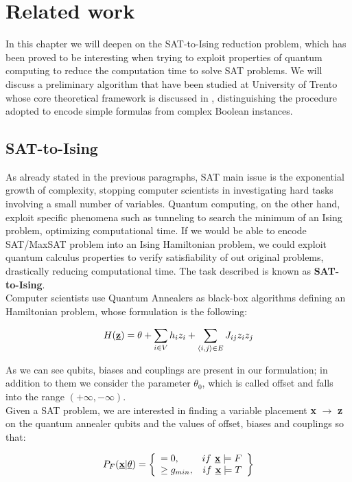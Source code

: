 \chapter{Related work}
\label{cha:related}

In this chapter we will deepen on the SAT-to-Ising reduction problem, which has been proved to be interesting when trying to exploit properties of quantum computing to reduce the computation time to solve SAT problems. We will discuss a preliminary algorithm that have been studied at University of Trento whose core theoretical framework is discussed in \cite{pa12}, distinguishing the procedure adopted to encode simple formulas from complex Boolean instances.

\section{SAT-to-Ising}
\label{sec:SATtoQUBO}

As already stated in the previous paragraphs, SAT main issue is the exponential growth of complexity, stopping computer scientists in investigating hard tasks involving a small number of variables. Quantum computing, on the other hand, exploit specific phenomena such as tunneling to search the minimum of an Ising problem, optimizing computational time. If we would be able to encode SAT/MaxSAT problem into an Ising Hamiltonian problem, we could exploit quantum calculus properties to verify satisfiability of out original problems, drastically reducing computational time. The task described is known as \textbf{SAT-to-Ising}. \\
Computer scientists use Quantum Annealers as black-box algorithms defining an Hamiltonian problem, whose formulation is the following:

\begin{equation}
    H(\textbf{\underline{z}}) =\theta + \sum_{i \in V} h_iz_i + \sum_{\langle i,j\rangle \in E} J_{ij} z_iz_j
\end{equation}

As we can see qubits, biases and couplings are present in our formulation; in addition to them we consider the parameter $\theta_0$, which is called offset and falls into the range $(+\infty, -\infty)$. \\
Given a SAT problem, we are interested in finding a variable placement \textbf{x} $\rightarrow$ \textbf{z} on the quantum annealer qubits and the values of offset, biases and couplings so that:

\begin{equation}
    P_F(\underline{\textbf{x}} | \underline{\theta}) = 
    \left\{
        \begin{array}{lr}
            = 0, & if \textbf{ \underline{x}} \models F \\
            \geq g_{min}, & if \textbf{ \underline{x}} \models T
        \end{array}
    \right\}
\end{equation}


